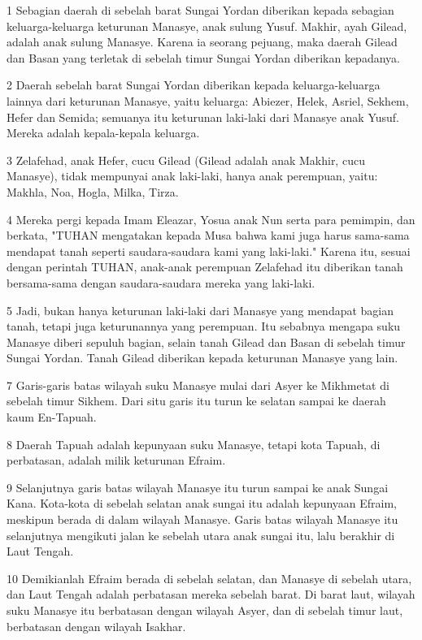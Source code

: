 \par 1 Sebagian daerah di sebelah barat Sungai Yordan diberikan kepada sebagian keluarga-keluarga keturunan Manasye, anak sulung Yusuf. Makhir, ayah Gilead, adalah anak sulung Manasye. Karena ia seorang pejuang, maka daerah Gilead dan Basan yang terletak di sebelah timur Sungai Yordan diberikan kepadanya.
\par 2 Daerah sebelah barat Sungai Yordan diberikan kepada keluarga-keluarga lainnya dari keturunan Manasye, yaitu keluarga: Abiezer, Helek, Asriel, Sekhem, Hefer dan Semida; semuanya itu keturunan laki-laki dari Manasye anak Yusuf. Mereka adalah kepala-kepala keluarga.
\par 3 Zelafehad, anak Hefer, cucu Gilead (Gilead adalah anak Makhir, cucu Manasye), tidak mempunyai anak laki-laki, hanya anak perempuan, yaitu: Makhla, Noa, Hogla, Milka, Tirza.
\par 4 Mereka pergi kepada Imam Eleazar, Yosua anak Nun serta para pemimpin, dan berkata, "TUHAN mengatakan kepada Musa bahwa kami juga harus sama-sama mendapat tanah seperti saudara-saudara kami yang laki-laki." Karena itu, sesuai dengan perintah TUHAN, anak-anak perempuan Zelafehad itu diberikan tanah bersama-sama dengan saudara-saudara mereka yang laki-laki.
\par 5 Jadi, bukan hanya keturunan laki-laki dari Manasye yang mendapat bagian tanah, tetapi juga keturunannya yang perempuan. Itu sebabnya mengapa suku Manasye diberi sepuluh bagian, selain tanah Gilead dan Basan di sebelah timur Sungai Yordan. Tanah Gilead diberikan kepada keturunan Manasye yang lain.
\par 7 Garis-garis batas wilayah suku Manasye mulai dari Asyer ke Mikhmetat di sebelah timur Sikhem. Dari situ garis itu turun ke selatan sampai ke daerah kaum En-Tapuah.
\par 8 Daerah Tapuah adalah kepunyaan suku Manasye, tetapi kota Tapuah, di perbatasan, adalah milik keturunan Efraim.
\par 9 Selanjutnya garis batas wilayah Manasye itu turun sampai ke anak Sungai Kana. Kota-kota di sebelah selatan anak sungai itu adalah kepunyaan Efraim, meskipun berada di dalam wilayah Manasye. Garis batas wilayah Manasye itu selanjutnya mengikuti jalan ke sebelah utara anak sungai itu, lalu berakhir di Laut Tengah.
\par 10 Demikianlah Efraim berada di sebelah selatan, dan Manasye di sebelah utara, dan Laut Tengah adalah perbatasan mereka sebelah barat. Di barat laut, wilayah suku Manasye itu berbatasan dengan wilayah Asyer, dan di sebelah timur laut, berbatasan dengan wilayah Isakhar.

